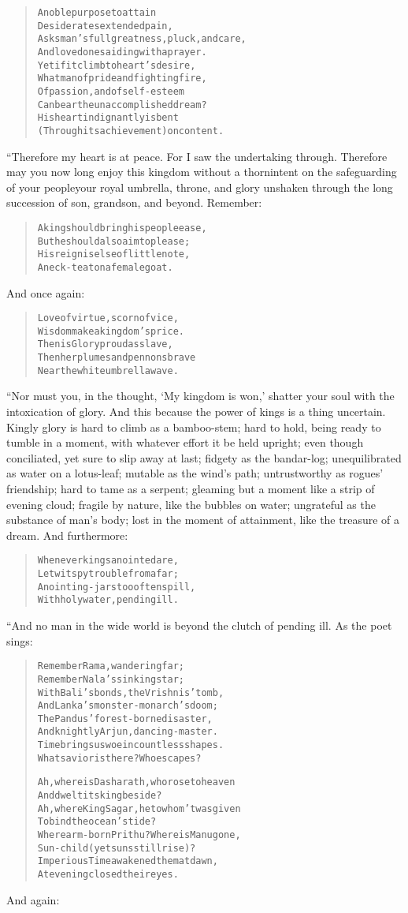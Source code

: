 \documentclass[article, twoside, 14pt]{memoir}
\renewenvironment{verbatim}{%
\begin{quote}%
\vskip -10pt%
\begin{alltt}\normalfont\large}{\end{alltt}%
\end{quote}%
\vskip -10pt
} %
\begin{document}
\begin{verbatim}
A noble purpose to attain
Desiderates extended pain,
Asks man's full greatness, pluck, and care,
And loved ones aiding with a prayer.
Yet if it climb to heart's desire,
What man of pride and fighting fire,
Of passion, and of self-esteem
Can bear the unaccomplished dream?
His heart indignantly is bent
(Through its achievement) on content.
\end{verbatim}
“Therefore my heart is at peace. For I saw the undertaking through.
Therefore may you now long enjoy this kingdom without a
thorn{\textemdash}intent on the safeguarding of your people{\textemdash}your royal
umbrella, throne, and glory unshaken through the long succession of
son, grandson, and beyond. Remember:

\begin{verbatim}
A king should bring his people ease,
But he should also aim to please;
His reign is else of little note,
A neck-teat on a female goat.
\end{verbatim}
And once again:

\begin{verbatim}
Love of virtue, scorn of vice,
Wisdom{\textemdash}make a kingdom's price.
Then is Glory proud as slave,
Then her plumes and pennons brave
Near the white umbrella wave.
\end{verbatim}
“Nor must you, in the thought, `My kingdom is won,' shatter your
soul with the intoxication of glory. And this because the power of
kings is a thing uncertain. Kingly glory is hard to climb as
a bamboo-stem; hard to hold, being ready to tumble in a moment,
with whatever effort it be held upright; even though conciliated,
yet sure to slip away at last; fidgety as the bandar-log;
unequilibrated as water on a lotus-leaf; mutable as the wind's
path; untrustworthy as rogues' friendship; hard to tame as a
serpent; gleaming but a moment like a strip of evening cloud;
fragile by nature, like the bubbles on water; ungrateful as the
substance of man's body; lost in the moment of attainment, like the
treasure of a dream. And furthermore:

\begin{verbatim}
Whenever kings anointed are,
Let wit spy trouble from afar;
Anointing-jars too often spill,
With holy water, pending ill.
\end{verbatim}
“And no man in the wide world is beyond the clutch of pending ill.
As the poet sings:

\begin{verbatim}
Remember Rama, wandering far;
Remember Nala's sinking star;
With Bali's bonds, the Vrishnis' tomb,
And Lanka's monster-monarch's doom;
The Pandus' forest-borne disaster,
And knightly Arjun, dancing-master.
Time brings us woe in countless shapes.
What savior is there? Who escapes?

Ah, where is Dasharath, who rose to heaven
    And dwelt its king beside?
Ah, where King Sagar, he to whom 'twas given
    To bind the ocean's tide?
Where arm-born Prithu? Where is Manu gone,
    Sun-child (yet suns still rise)?
Imperious Time awakened them at dawn,
At evening closed their eyes.
\end{verbatim}
And again:
\end{document}

